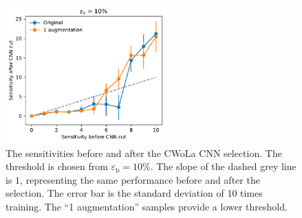 \documentclass[12pt]{article}
\begin{document}
        \begin{figure}[htpb]
            \centering
            \includegraphics[width=0.55\textwidth]{HVmodel_sensitivity_improvement_bkg_eff_10_only_aug_1.pdf}
            \caption{The sensitivities before and after the CWoLa CNN selection. The threshold is chosen from $\varepsilon_{\text{b}} = 10\%$. The slope of the dashed grey line is $1$, representing the same performance before and after the selection. The error bar is the standard deviation of 10 times training. The ``1 augmentation'' samples provide a lower threshold.}
            \label{fig:sensitivity_improvement_bkg_eff_01_only_aug_1}
        \end{figure}
\end{document}
